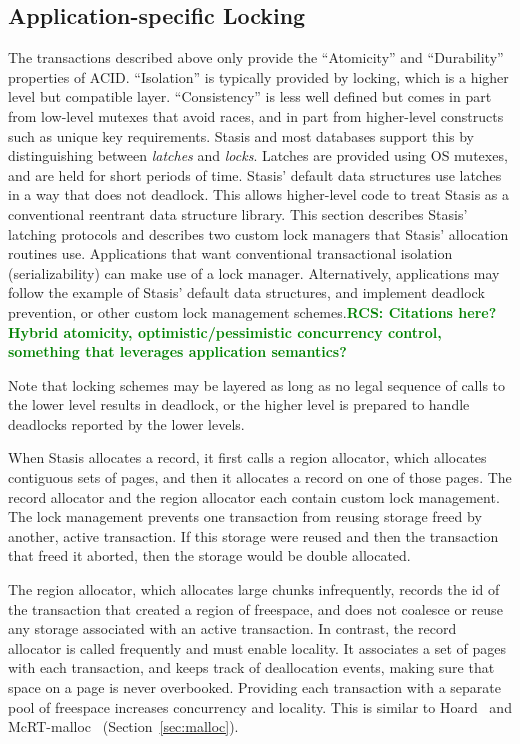 \documentclass[letterpaper,twocolumn,10pt]{article}
\newcommand{\yad}{Stasis\xspace}
\newcommand{\yads}{Stasis'\xspace}
\newcommand{\rcs}[1]{\textcolor{green}{\bf RCS: #1}}
\begin{document}
\subsection{Application-specific Locking}
\label{sec:locking}
The transactions described above only provide the
``Atomicity'' and ``Durability'' properties of ACID.
  ``Isolation'' is
typically provided by locking, which is a higher level but
compatible layer.  ``Consistency'' is less well defined but comes in
part from low-level mutexes that avoid races, and in part from
higher-level constructs such as unique key requirements.  \yad and most databases support this by distinguishing between {\em latches} and {\em locks}.
Latches are provided using OS mutexes, and are held for
short periods of time.  \yads default data structures use latches in a
way that does not deadlock.  This allows higher-level code to treat 
\yad as a conventional reentrant data structure library.  
This section describes \yads latching protocols and describes two custom lock
managers that \yads allocation routines use.  Applications that want
conventional transactional isolation (serializability) can make 
use of a lock manager.  Alternatively, applications may follow 
the example of \yads default data structures, and implement 
deadlock prevention, or other custom lock management schemes.\rcs{Citations here? Hybrid atomicity, optimistic/pessimistic concurrency control, something that leverages application semantics?}

Note that locking schemes may be
layered as long as no legal sequence of calls to the lower level
results in deadlock, or the higher level is prepared to handle
deadlocks reported by the lower levels.

When \yad allocates a
record, it first calls a region allocator, which allocates contiguous
sets of pages, and then it allocates a record on one of those pages.
The record allocator and the region allocator each contain custom lock
management.  The lock management prevents one transaction from reusing 
storage freed by another, active transaction.  If this storage were 
reused and then the transaction that freed it aborted, then the 
storage would be double allocated.

The region allocator, which allocates large chunks infrequently, records the id
of the transaction that created a region of freespace, and does not
coalesce or reuse any storage associated with an active transaction.
In contrast, the record allocator is called frequently and must enable locality.  It associates a set of pages with
each transaction, and keeps track of deallocation events, making sure
that space on a page is never overbooked.  Providing each
transaction with a separate pool of freespace increases 
concurrency and locality.  This is 
similar to Hoard~\cite{hoard} and 
McRT-malloc~\cite{mcrt} (Section~\ref{sec:malloc}).
\end{document}
